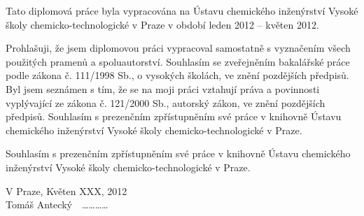 Tato diplomová práce byla vypracována na Ústavu chemického inženýrství Vysoké školy chemicko-technologické v Praze v období leden 2012 -- květen 2012.


\vspace{16cm}
Prohlašuji, že jsem diplomovou práci vypracoval samostatně s vyznačením všech použitých pramenů a spoluautorství. Souhlasím se zveřejněním bakalářské práce podle zákona č. 111/1998 Sb., o vysokých školách, ve znění pozdějších předpisů. Byl jsem seznámen s tím, že se na moji práci vztahují práva a povinnosti vyplývající ze zákona č. 121/2000 Sb., autorský zákon, ve znění pozdějších předpisů. Souhlasím s prezenčním zpřístupněním své práce v knihovně Ústavu chemického inženýrství Vysoké školy chemicko-technologické v Praze.

Souhlasím s prezenčním zpřístupněním své práce v knihovně Ústavu chemického inženýrství Vysoké školy chemicko-technologické v Praze.

\vspace{1cm}
\noindent
V Praze, Květen XXX, 2012\\

\hfill Tomáš Antecký \,\, \ldots\ldots\ldots\ldots